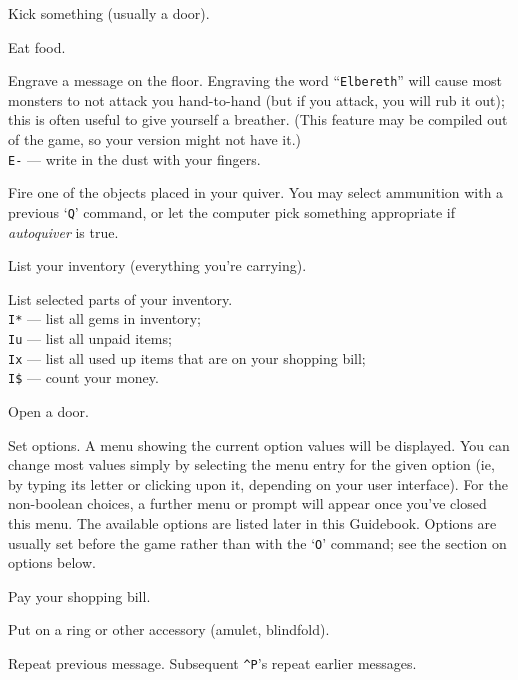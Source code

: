 Kick something (usually a door).
\item[\tb{e}]
Eat food.
\item[\tb{E}]
Engrave a message on the floor.
Engraving the word ``{\tt Elbereth}'' will cause most monsters to not attack
you hand-to-hand (but if you attack, you will rub it out); this is
often useful to give yourself a breather.  (This feature may be compiled out
of the game, so your version might not have it.)\\
{\tt E-} --- write in the dust with your fingers.
\item[\tb{f}]
Fire one of the objects placed in your quiver.  You may select
ammunition with a previous `{\tt Q}' command, or let the computer pick
something appropriate if {\it autoquiver\/} is true.
\item[\tb{i}]
List your inventory (everything you're carrying).
\item[\tb{I}]
List selected parts of your inventory.\\
{\tt I*} --- list all gems in inventory;\\
{\tt Iu} --- list all unpaid items;\\
{\tt Ix} --- list all used up items that are on your shopping bill;\\
{\tt I\$} --- count your money.
\item[\tb{o}]
Open a door.
\item[\tb{O}]
Set options.  A menu showing the current option values will be
displayed.  You can change most values simply by selecting the menu
entry for the given option (ie, by typing its letter or clicking upon
it, depending on your user interface).  For the non-boolean choices,
a further menu or prompt will appear once you've closed this menu.
The available options
are listed later in this Guidebook.  Options are usually set before the
game rather than with the `{\tt O}' command; see the section on options below.
\item[\tb{p}]
Pay your shopping bill.
\item[\tb{P}]
Put on a ring or other accessory (amulet, blindfold).
\item[\tb{\^{}P}]
Repeat previous message.  Subsequent {\tt \^{}P}'s repeat earlier messages.
